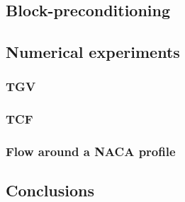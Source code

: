 \documentclass[compress,11 pt,t]{beamer}
\begin{document}
\subsection{Block-preconditioning}

\subsection{Numerical experiments}

\subsubsection{TGV}

\subsubsection{TCF}

\subsubsection{Flow around a NACA profile}

\subsection{Conclusions}

\end{document}
